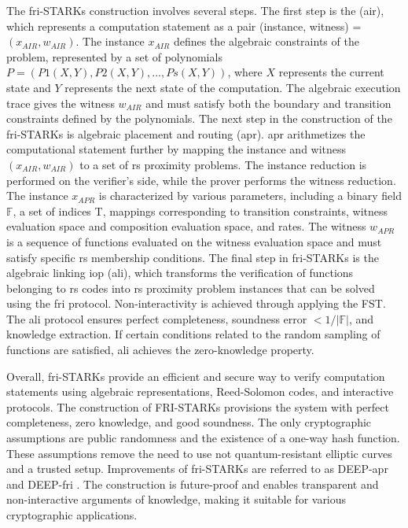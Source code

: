 The \acrshort{fri}-STARKs construction involves several steps. The first step is the (\acrshort{air}), which represents a computation statement as a pair (instance, witness) = \((x_{AIR}, w_{AIR})\). The instance \(x_{AIR}\) defines the algebraic constraints of the problem, represented by a set of polynomials \(P = (P1(X, Y), P2(X, Y), ..., Ps(X, Y))\), where \(X\) represents the current state and \(Y\) represents the next state of the computation. The algebraic execution trace gives the witness \(w_{AIR}\) and must satisfy both the boundary and transition constraints defined by the polynomials. The next step in the construction of the \acrshort{fri}-STARKs is algebraic placement and routing (\acrshort{apr}). \acrshort{apr} arithmetizes the computational statement further by mapping the instance and witness \((x_{AIR}, w_{AIR})\) to a set of \acrshort{rs} proximity problems. The instance reduction is performed on the verifier's side, while the prover performs the witness reduction. The instance \(x_{APR}\) is characterized by various parameters, including a binary field \begin{math} \mathbb{F}\end{math}, a set of indices T, mappings corresponding to transition constraints, witness evaluation space and composition evaluation space, and rates. The witness \(w_{APR}\) is a sequence of functions evaluated on the witness evaluation space and must satisfy specific \acrshort{rs} membership conditions. The final step in \acrshort{fri}-STARKs is the algebraic linking \acrshort{iop} (\acrshort{ali}), which transforms the verification of functions belonging to \acrshort{rs} codes into \acrshort{rs} proximity problem instances that can be solved using the \acrshort{fri} protocol. Non-interactivity is achieved through applying the FST. The \acrshort{ali} protocol ensures perfect completeness, soundness error \(< 1/| \)\begin{math} \mathbb{F}\end{math}\(|\), and knowledge extraction. If certain conditions related to the random sampling of functions are satisfied, \acrshort{ali} achieves the zero-knowledge property. 

Overall, \acrshort{fri}-STARKs provide an efficient and secure way to verify computation statements using algebraic representations, Reed-Solomon codes, and interactive protocols. The construction of FRI-STARKs provisions the system with perfect completeness, zero knowledge, and good soundness. The only cryptographic assumptions are public randomness and the existence of a one-way hash function. These assumptions remove the need to use not quantum-resistant elliptic curves and a trusted setup. Improvements of \acrshort{fri}-STARKs are referred to as DEEP-\acrshort{apr} and DEEP-\acrshort{fri} \citep{bensasson2019deepfri}. The construction is future-proof and enables transparent and non-interactive arguments of knowledge, making it suitable for various cryptographic applications.


